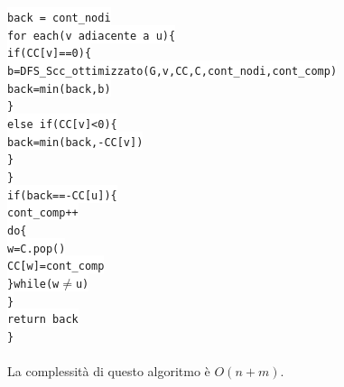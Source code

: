 \documentclass[12pt, letterpaper]{article}
\newcommand{\codee}[1]{\colorbox{white}{\texttt{#1}}}
\newcommand{\acc}{\\\hphantom{}\\}
\begin{document}
\hphantom{ident}\codee{back = cont\_nodi}\\
\hphantom{ident}\codee{for each(v adiacente a u)\{}\\
\hphantom{ident}\hphantom{ident}\codee{if(CC[v]==0)\{}\\
\hphantom{ident}\hphantom{ident}\hphantom{ident}\codee{b=DFS\_Scc\_ottimizzato(G,v,CC,C,cont\_nodi,cont\_comp)}\\
\hphantom{ident}\hphantom{ident}\hphantom{ident}\codee{back=min(back,b)}\\
\hphantom{ident}\hphantom{ident}\codee{\}}\\
\hphantom{ident}\hphantom{ident}\codee{else if(CC[v]<0)\{}\\
\hphantom{ident}\hphantom{ident}\hphantom{ident}\codee{back=min(back,-CC[v])}\\
\hphantom{ident}\hphantom{ident}\codee{\}}\\
\hphantom{ident}\codee{\}}\\
\hphantom{ident}\codee{if(back==-CC[u])\{}\\
\hphantom{ident}\hphantom{ident}\codee{cont\_comp++}\\
\hphantom{ident}\hphantom{ident}\codee{do\{}\\
\hphantom{ident}\hphantom{ident}\hphantom{ident}\codee{w=C.pop()}\\
\hphantom{ident}\hphantom{ident}\hphantom{ident}\codee{CC[w]=cont\_comp}\\
\hphantom{ident}\hphantom{ident}\codee{\}while(w$\ne$u)}\\
\hphantom{ident}\codee{\}}\\
\hphantom{ident}\codee{return back}\\
\codee{\}}\acc
La complessità di questo algoritmo è $O(n+m)$.
\end{document}
